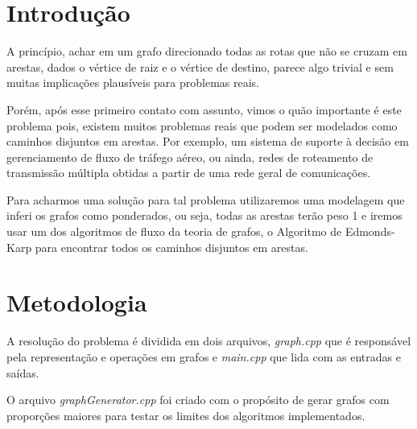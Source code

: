 
\section{\esp Introdução}
A princípio, achar em um grafo direcionado todas as rotas que não se cruzam em arestas, dados o vértice de raiz e o vértice de destino, parece algo trivial e sem muitas implicações plausíveis para problemas reais.

 Porém, após esse primeiro contato com assunto, vimos o quão importante é este problema pois, existem muitos problemas reais que podem ser modelados como caminhos disjuntos em arestas. Por exemplo, um sistema de suporte à decisão em gerenciamento de fluxo de tráfego aéreo, ou ainda, redes de roteamento de transmissão múltipla obtidas a partir de uma rede geral de comunicações.
 
Para acharmos uma solução para tal problema utilizaremos uma modelagem que inferi os grafos como ponderados, ou seja, todas as arestas terão peso 1 e iremos usar um dos algoritmos de fluxo da teoria de grafos, o Algoritmo de Edmonds-Karp para encontrar todos os caminhos disjuntos em arestas.



\section{\esp Metodologia}

A resolução do problema é dividida em dois arquivos, \textit{graph.cpp} que é responsável
pela representação e operações em grafos e \textit{main.cpp} que lida com as entradas e saídas.

O arquivo \textit{graphGenerator.cpp}\cite{sanfoundry} foi criado com o propósito de gerar grafos com proporções
maiores para testar os limites dos algoritmos implementados.

